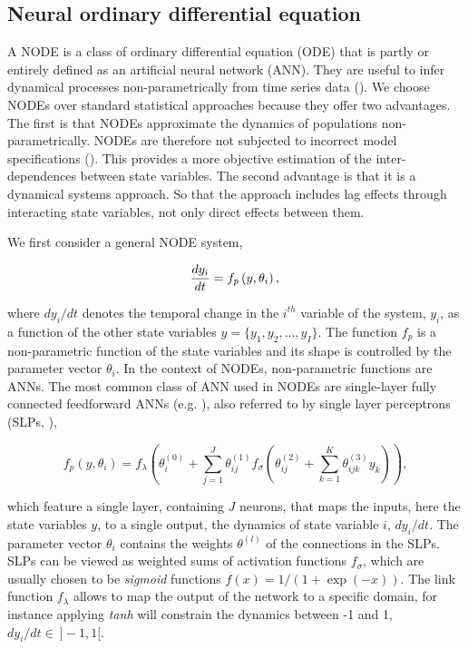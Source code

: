 \documentclass[11pt, oneside]{article}
\begin{document}
\subsection{Neural ordinary differential equation}

A NODE is a class of ordinary differential equation (ODE) that is partly or entirely defined as an artificial neural network (ANN).
They are useful to infer dynamical processes non-parametrically from time series data (\cite{Bonnaffe2021a}).
We choose NODEs over standard statistical approaches because they offer two advantages. 
The first is that NODEs approximate the dynamics of populations non-parametrically.
NODEs are therefore not subjected to incorrect model specifications (\cite{Jost2000,Adamson2013}).
This provides a more objective estimation of the inter-dependences between state variables. 
The second advantage is that it is a dynamical systems approach. 
So that the approach includes lag effects through interacting state variables, not only direct effects between them. 

We first consider a general NODE system,

\vspace{-0.5cm}
\begin{equation}
    \frac{dy_i}{dt} = f_p \left(y,\theta_i \right), \\
\end{equation}

where $dy_i/dt$ denotes the temporal change in the $i^{th}$ variable of the system, $y_i$, as a function of the other state variables $y = \{ y_1, y_2, ..., y_I\}$.
The function $f_p$ is a non-parametric function of the state variables and its shape is controlled by the parameter vector $\theta_i$.
In the context of NODEs, non-parametric functions are ANNs.
The most common class of ANN used in NODEs are single-layer fully connected feedforward ANNs (e.g. \cite{Wu2005}), also referred to by single layer perceptrons (SLPs, \cite{Bonnaffe2021a}),

\vspace{-0.5cm}
\begin{equation}
    f_p \left(y, \theta_i \right) = f_\lambda \left( \theta_i^{(0)} + \sum_{j=1}^{J} \theta^{(1)}_{ij} f_\sigma \left( \theta^{(2)}_{ij} + \sum_{k=1}^{K} \theta^{(3)}_{ijk} y_k \right) \right),
\end{equation}

which feature a single layer, containing $J$ neurons, that maps the inputs, here the state variables $y$, to a single output, the dynamics of state variable $i$, $dy_i/dt$.
The parameter vector $\theta_i$ contains the weights $\theta^{(l)}$ of the connections in the SLPs.
SLPs can be viewed as weighted sums of activation functions $f_\sigma$, which are usually chosen to be \textit{sigmoid} functions $f(x) = 1/(1+\exp(-x))$.
The link function $f_\lambda$ allows to map the output of the network to a specific domain, for instance applying \textit{tanh} will constrain the dynamics between -1 and 1, $dy_i/dt \in~]-1,1[$. 
\end{document}
